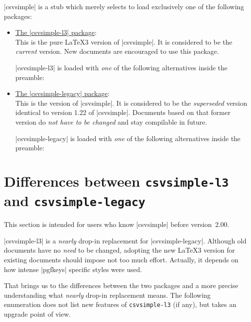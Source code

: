 \documentclass[a4paper,11pt]{ltxdoc}
\begin{document}
|csvsimple| is a stub which merely selects to load exclusively one of the
following packages:
\begin{itemize}
\item \href{csvsimple-l3.pdf}{\flqq The |csvsimple-l3| package\frqq}:\\
  This is the pure \LaTeX3 version of |csvsimple|. It is considered
  to be the \emph{current} version.
  New documents are encouraged to use this package.\par
  |csvsimple-l3| is loaded with \emph{one} of the following
  alternatives inside the preamble:
\begin{dispListing}
\usepackage[l3]{csvsimple}
\usepackage{csvsimple-l3}
\end{dispListing}
\medskip

\item \href{csvsimple-legacy.pdf}{\flqq The |csvsimple-legacy| package\frqq}:\\
  This is the \LaTeXe{} version of |csvsimple|. It is considered
  to be the \emph{superseded} version identical to version 1.22 of |csvsimple|.
  Documents based on that former version do \emph{not have to be changed}
  and stay compilable in future.\par
  |csvsimple-legacy| is loaded with \emph{one} of the following
  alternatives inside the preamble:
\begin{dispListing}
\usepackage{csvsimple}
\usepackage[legacy]{csvsimple}
\usepackage{csvsimple-legacy}
\end{dispListing}
\end{itemize}


\clearpage
\section{Differences between \texttt{csvsimple-l3} and \texttt{csvsimple-legacy}}
This section is intended for users who know |csvsimple| before version~2.00.

|csvsimple-l3| is a \emph{nearly} drop-in replacement for
|csvsimple-legacy|. Although old documents have no \emph{need} to be changed,
adopting the new \LaTeX3 version for existing documents should impose not
too much effort. Actually, it depends on how intense |pgfkeys| specific
styles were used.

That brings us to the differences between the two packages and a more precise
understanding what \emph{nearly} drop-in replacement means. The following enumeration
does not list new features of \texttt{csvsimple-l3} (if any), but takes an
upgrade point of view.
\end{document}
